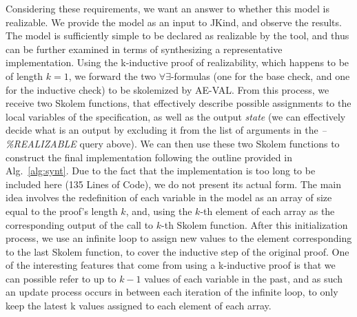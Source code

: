 Considering these requirements, we want an answer to whether this model is
realizable. We provide the model as an input to JKind, and observe the results.
The model is sufficiently simple to be declared as realizable by the tool, and
thus can be further examined in terms of synthesizing a representative
implementation. Using the k-inductive proof of realizability, which happens to
be of length $k = 1$, we forward the two $\forall\exists$-formulas (one for the
base check, and one for the inductive check) to be skolemized by AE-VAL. From
this process, we receive two Skolem functions, that effectively describe
possible assignments to the local variables of the specification, as well as the
output \textit{state} (we can effectively decide what is an output by excluding
it from the list of arguments in the \textit{--\%REALIZABLE} query above). We
can then use these two Skolem functions to construct the final implementation
following the outline provided in Alg.~\ref{alg:synt}. Due to the fact that the
implementation is too long to be included here (135 Lines of Code), we do not
present its actual form. The main idea involves the redefinition of each
variable in the model as an array of size equal to the proof's length $k$, and,
using the $k$-th element of each array as the corresponding output of the call
to $k$-th Skolem function. After this initialization process, we use an infinite
loop to assign new values to the element corresponding to the last Skolem
function, to cover the inductive step of the original proof. One of the
interesting features that come from using a k-inductive proof is that we can
possible refer to up to $k-1$ values of each variable in the past, and as such
an update process occurs in between each iteration of the infinite loop, to only
keep the latest k values assigned to each element of each array.
